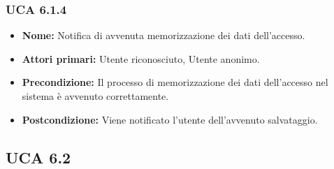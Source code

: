 \subsubsection{UCA 6.1.4}%
\begin{itemize}
	\item \textbf{Nome:} Notifica di avvenuta memorizzazione dei dati dell'accesso.
	\item \textbf{Attori primari:} Utente riconosciuto, Utente anonimo.
	\item \textbf{Precondizione:} Il processo di memorizzazione dei dati dell'accesso nel sistema è avvenuto correttamente.
	\item \textbf{Postcondizione:} Viene notificato l'utente dell'avvenuto salvataggio.
\end{itemize}

\subsection{UCA 6.2}%
